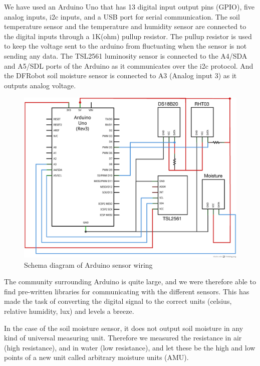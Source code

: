 We have used an Arduino Uno that has 13 digital input output pins (GPIO), five analog inputs, i2c inputs, and a USB port for serial communication. The soil temperature sensor and the temperature and humidity sensor are connected to the digital inputs through a 1K(ohm) pullup resistor. The pullup resistor is used to keep the voltage sent to the arduino from fluctuating when the sensor is not sending any data. The TSL2561 luminosity sensor is connected to the A4/SDA and A5/SDL ports of the Arduino as it communicates over the i2c protocol. And the DFRobot soil moisture sensor is connected to A3 (Analog input 3) as it outputs analog voltage.  

\begin{figure}
\centering
\includegraphics[width=1\textwidth]{img/hardware/Arduino_and_sensors_schem.png}
\caption{Schema diagram of Arduino sensor wiring}
\label{fig:arduino}
\end{figure}

The community surrounding Arduino is quite large, and we were therefore able to find pre-written libraries for communicating with the different sensors. This has made the task of converting the digital signal to the correct units (celsius, relative humidity, lux) and levels a breeze. 

In the case of the soil moisture sensor, it does not output soil moisture in any kind of universal measuring unit. Therefore we measured the resistance in air (high resistance), and in water (low resistance), and let these be the high and low points of a new unit called arbitrary moisture units (AMU).

